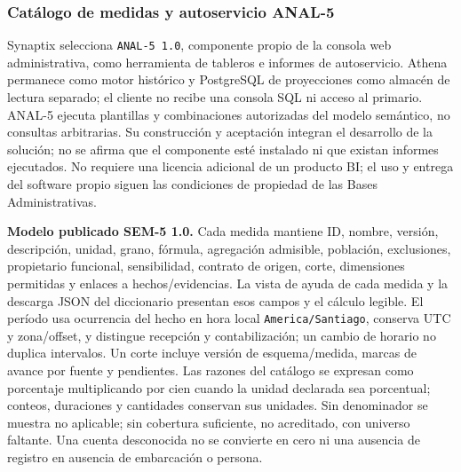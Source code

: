 \subsubsection{Catálogo de medidas y autoservicio ANAL-5}
\label{subsec:sd5_anal5}

Synaptix selecciona \texttt{ANAL-5 1.0}, componente propio de la consola web administrativa, como herramienta de tableros e informes de autoservicio. Athena permanece como motor histórico y PostgreSQL de proyecciones como almacén de lectura separado; el cliente no recibe una consola SQL ni acceso al primario. ANAL-5 ejecuta plantillas y combinaciones autorizadas del modelo semántico, no consultas arbitrarias. Su construcción y aceptación integran el desarrollo de la solución; no se afirma que el componente esté instalado ni que existan informes ejecutados. No requiere una licencia adicional de un producto BI; el uso y entrega del software propio siguen las condiciones de propiedad de las Bases Administrativas.

\textbf{Modelo publicado SEM-5 1.0.} Cada medida mantiene ID, nombre, versión, descripción, unidad, grano, fórmula, agregación admisible, población, exclusiones, propietario funcional, sensibilidad, contrato de origen, corte, dimensiones permitidas y enlaces a hechos/evidencias. La vista de ayuda de cada medida y la descarga JSON del diccionario presentan esos campos y el cálculo legible. El período usa ocurrencia del hecho en hora local \texttt{America/Santiago}, conserva UTC y zona/offset, y distingue recepción y contabilización; un cambio de horario no duplica intervalos. Un corte incluye versión de esquema/medida, marcas de avance por fuente y pendientes. Las razones del catálogo se expresan como porcentaje multiplicando por cien cuando la unidad declarada sea porcentual; conteos, duraciones y cantidades conservan sus unidades. Sin denominador se muestra no aplicable; sin cobertura suficiente, no acreditado, con universo faltante. Una cuenta desconocida no se convierte en cero ni una ausencia de registro en ausencia de embarcación o persona.


